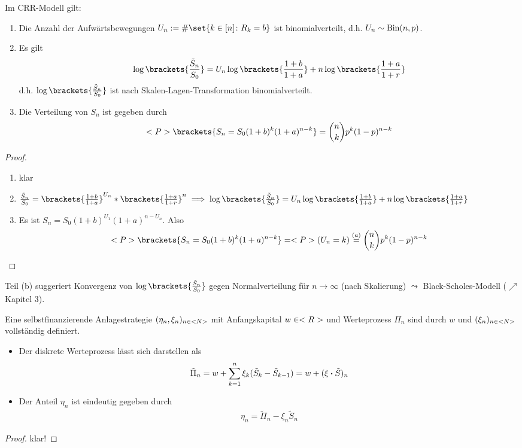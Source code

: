 \begin{proposition} %
	Im CRR-Modell gilt:
	\begin{enumerate}
		\item Die Anzahl der Aufwärtsbewegungen $U_n := \# \set{k \in [n] \colon R_k = b}$ ist binomialverteilt, d.h. $U_n \sim \operatorname{Bin}(n,p)$.
		\item Es gilt 
		\begin{align*}
		\log\brackets{\frac{\tilde{S}_n}{S_0}} = U_n \log\brackets{\frac{1+b}{1+a}} + n \log\brackets{\frac{1+a}{1+r}}
		\end{align*}
		d.h. $\log\brackets{\frac{\tilde{S}_n}{S_0}}$ ist nach Skalen-Lagen-Transformation binomialverteilt.
		\item Die Verteilung von $S_n$ ist gegeben durch
		\begin{align*}
		\P\brackets{S_n = S_0 (1+b)^k (1+a)^{n-k}} = \binom{n}{k} p^k (1-p)^{n-k}
		\end{align*} 
	\end{enumerate}
\end{proposition}
\begin{proof}
	\begin{enumerate}
		\item klar
		\item $\frac{\tilde{S}_n}{S_0} = \brackets{\frac{1+b}{1+a}}^{U_n} * \brackets{\frac{1+a}{1+r}}^n \implies \log\brackets{\frac{\tilde{S}_n}{S_0}} = U_n \log\brackets{\frac{1+b}{1+a}} + n \log\brackets{\frac{1+a}{1+r}}$
		\item Es ist $S_n = S_0 (1+b)^{U_1}(1+a)^{n-U_n} $. Also
		\begin{align*}
		\P\brackets{S_n = S_0 (1+b)^k (1+a)^{n-k}} = \P(U_n = k) \overset{(a)}{=} \binom{n}{k} p^k (1-p)^{n-k}
		\end{align*}
	\end{enumerate}
\end{proof}
\begin{*remark}
	Teil (b) suggeriert Konvergenz von $\log\brackets{\frac{\tilde{S}_n}{S_0}}$ gegen Normalverteilung für $n \to \infty$ (nach Skalierung) 
	$\leadsto$ Black-Scholes-Modell ($\nearrow$ Kapitel 3).
\end{*remark}
\begin{lemma} %
	Eine selbstfinanzierende Anlagestrategie $(\eta_n,\xi_n)_{n\in <N>}$ mit Anfangskapital $w \in <R>$ und Werteprozess $\Pi_n$ sind durch $w$ und $(\xi_n)_{n \in <N>}$ vollständig definiert.
	\begin{itemize}
		\item Der diskrete Werteprozess lässt sich darstellen als
		\begin{align*}
		\tilde{\Pi}_n = w + \sum_{k=1}^n \xi_k (\tilde{S}_k - \tilde{S}_{k-1}) = w + (\xi \boldsymbol{\cdot} \tilde{S})_n
		\end{align*}
		\item Der Anteil $\eta_n$ ist eindeutig gegeben durch
		\begin{align*}
			\eta_n = \tilde{\Pi}_n - \xi_n \tilde{S}_n
		\end{align*}
	\end{itemize}
\end{lemma}
\begin{proof}
	klar!
\end{proof}

